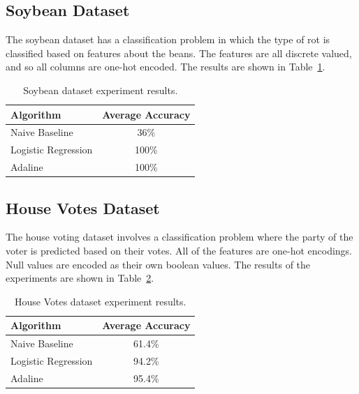 \documentclass{amsart}
\begin{document}
    \subsection{Soybean Dataset}
    The soybean dataset\cite{soybeandataset} has a classification
    problem in which the type of rot is classified based on
    features about the beans. The features are all discrete
    valued, and so all columns are one-hot encoded. The results
    are shown in Table~\ref{soybean_results}.
    \begin{table}[H]
    \begin{tabular}{lc}
    Algorithm & Average Accuracy \\
    \hline
    Naive Baseline & 36\% \\
    Logistic Regression & 100\% \\
    Adaline & 100\%
    \end{tabular}
    \label{soybean_results}
    \caption{Soybean dataset experiment results.}
    \end{table}

    \subsection{House Votes Dataset}
    The house voting dataset\cite{housedataset} involves a classification
    problem where the party of the voter is predicted
    based on their votes. All of the features are one-hot encodings.
    Null values are encoded as their own boolean values.
    The results of the experiments are shown in Table~\ref{house_votes_results}.
    \begin{table}[H]
    \begin{tabular}{lc}
    Algorithm & Average Accuracy \\
    \hline
    Naive Baseline & 61.4\% \\
    Logistic Regression & 94.2\% \\
    Adaline & 95.4\%
    \end{tabular}
    \label{house_votes_results}
    \caption{House Votes dataset experiment results.}
    \end{table}





\end{document}
